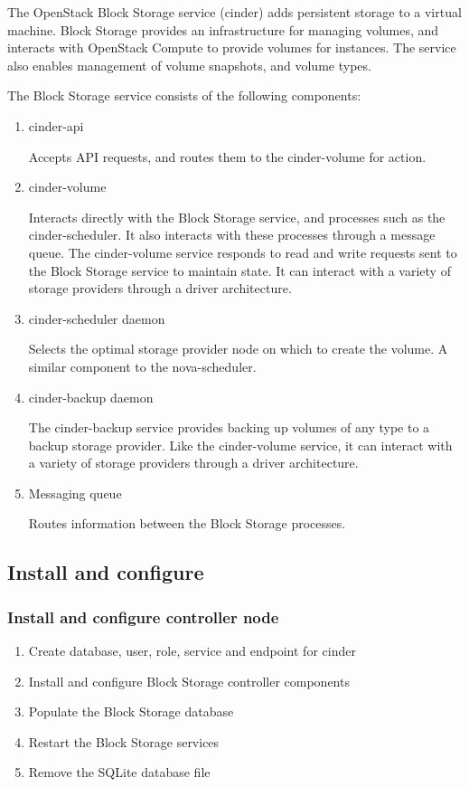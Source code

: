         \par The OpenStack Block Storage service (cinder) adds persistent storage to a virtual machine. Block Storage provides an infrastructure for managing volumes, and interacts with OpenStack Compute to provide volumes for instances. The service also enables management of volume snapshots, and volume types.
        
        \par The Block Storage service consists of the following components:
        \begin{enumerate}
            \item cinder-api
            \par Accepts API requests, and routes them to the cinder-volume for action.
        
            \item cinder-volume
            \par Interacts directly with the Block Storage service, and processes such as the cinder-scheduler. It also interacts with these processes through a message queue. The cinder-volume service responds to read and write requests sent to the Block Storage service to maintain state. It can interact with a variety of storage providers through a driver architecture.
        
            \item cinder-scheduler daemon
            \par Selects the optimal storage provider node on which to create the volume. A similar component to the nova-scheduler.
        
            \item cinder-backup daemon
            \par The cinder-backup service provides backing up volumes of any type to a backup storage provider. Like the cinder-volume service, it can interact with a variety of storage providers through a driver architecture.
        
            \item Messaging queue
            \par Routes information between the Block Storage processes.
        \end{enumerate}
    \subsection{Install and configure}
    \subsubsection{Install and configure controller node}
        \begin{enumerate}
            \item Create database, user, role, service and endpoint for cinder
            \item Install and configure Block Storage controller components
            \item Populate the Block Storage database
            \item Restart the Block Storage services
            \item Remove the SQLite database file
        \end{enumerate}   
